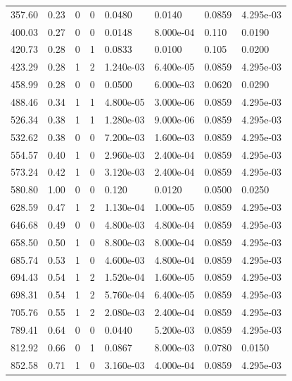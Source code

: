 \documentclass[preview]{standalone}
\begin{document}
{{\begin{tabular}{L{1.2cm}C{1.2cm} C{0.3cm}C{0.5cm} C{1.4cm}C{1.4cm} C{1.4cm}C{1.4cm}}
  357.60  &  0.23  & 0     &  0 &  0.0480  & 0.0140  & 0.0859 &  4.295e-03   \\ 
  400.03  &  0.27  & 0     &  0 &  0.0148  & 8.000e-04  & 0.110 &  0.0190   \\ 
  420.73  &  0.28  & 0     &  1 &  0.0833  & 0.0100  & 0.105 &  0.0200   \\ 
  423.29  &  0.28  & 1     &  2 &  1.240e-03  & 6.400e-05  & 0.0859 &  4.295e-03   \\ 
  458.99  &  0.28  & 0     &  0 &  0.0500  & 6.000e-03  & 0.0620 &  0.0290   \\ 
  488.46  &  0.34  & 1     &  1 &  4.800e-05  & 3.000e-06  & 0.0859 &  4.295e-03   \\ 
  526.34  &  0.38  & 1     &  1 &  1.280e-03  & 9.000e-06  & 0.0859 &  4.295e-03   \\ 
  532.62  &  0.38  & 0     &  0 &  7.200e-03  & 1.600e-03  & 0.0859 &  4.295e-03   \\ 
  554.57  &  0.40  & 1     &  0 &  2.960e-03  & 2.400e-04  & 0.0859 &  4.295e-03   \\ 
  573.24  &  0.42  & 1     &  0 &  3.120e-03  & 2.400e-04  & 0.0859 &  4.295e-03   \\ 
  580.80  &  1.00  & 0     &  0 &  0.120  & 0.0120  & 0.0500 &  0.0250   \\ 
  628.59  &  0.47  & 1     &  2 &  1.130e-04  & 1.000e-05  & 0.0859 &  4.295e-03   \\ 
  646.68  &  0.49  & 0     &  0 &  4.800e-03  & 4.800e-04  & 0.0859 &  4.295e-03   \\ 
  658.50  &  0.50  & 1     &  0 &  8.800e-03  & 8.000e-04  & 0.0859 &  4.295e-03   \\ 
  685.74  &  0.53  & 1     &  0 &  4.600e-03  & 4.800e-04  & 0.0859 &  4.295e-03   \\ 
  694.43  &  0.54  & 1     &  2 &  1.520e-04  & 1.600e-05  & 0.0859 &  4.295e-03   \\ 
  698.31  &  0.54  & 1     &  2 &  5.760e-04  & 6.400e-05  & 0.0859 &  4.295e-03   \\ 
  705.76  &  0.55  & 1     &  2 &  2.080e-03  & 2.400e-04  & 0.0859 &  4.295e-03   \\ 
  789.41  &  0.64  & 0     &  0 &  0.0440  & 5.200e-03  & 0.0859 &  4.295e-03   \\ 
  812.92  &  0.66  & 0     &  1 &  0.0867  & 8.000e-03  & 0.0780 &  0.0150   \\ 
  852.58  &  0.71  & 1     &  0 &  3.160e-03  & 4.000e-04  & 0.0859 &  4.295e-03   \\ 

\end{tabular}}}
\end{document}
